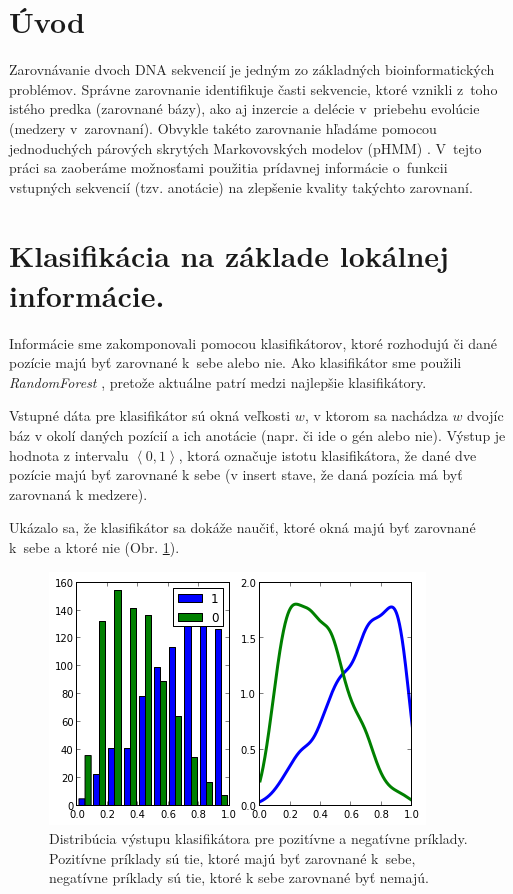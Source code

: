 \documentclass[myposter,portrait]{sciposter}
\def\mysection#1{
{\color{SectionCol}\section*{\sc\bfseries #1}}}
\begin{document}
\begin{multicols*}{3}


\mysection{Úvod}

Zarovnávanie dvoch DNA sekvencií je jedným zo základných
bioinformatických problémov. Správne zarovnanie identifikuje časti
sekvencie, ktoré vznikli z~toho istého predka (zarovnané bázy), ako aj
inzercie a delécie v~priebehu evolúcie (medzery v~zarovnaní). Obvykle
takéto zarovnanie hľadáme pomocou jednoduchých párových skrytých
Markovovských modelov (pHMM) \cite{durbin}. V~tejto práci sa zaoberáme
možnosťami použitia prídavnej informácie o~funkcii vstupných sekvencií
(tzv. anotácie) na zlepšenie kvality takýchto zarovnaní.

\mysection{Klasifikácia na základe lokálnej informácie.}

Informácie sme zakomponovali pomocou klasifikátorov, ktoré rozhodujú či dané pozície majú byť zarovnané k~sebe alebo nie. Ako klasifikátor sme použili \emph{RandomForest} \cite{randomForestPaper}, pretože aktuálne patrí medzi najlepšie klasifikátory.

Vstupné dáta pre klasifikátor sú okná veľkosti $w$, v ktorom sa nachádza $w$ dvojíc báz v okolí daných pozícií a ich anotácie (napr. či ide o gén alebo nie). Výstup je hodnota z intervalu $\left<0,1\right>$, ktorá označuje istotu klasifikátora, že dané dve pozície majú byť zarovnané k sebe (v insert stave, že daná pozícia má byť zarovnaná k medzere).

Ukázalo sa, že klasifikátor sa dokáže naučiť, ktoré okná majú byť zarovnané k~sebe a ktoré nie (Obr. \ref{fig:clf-m-dist}).

\begin{figure}[htp]
    \centering
    \includegraphics[width=\textwidth, clip=true]{images/clf_m_test}
    \caption{Distribúcia výstupu klasifikátora pre pozitívne a negatívne príklady. Pozitívne príklady sú tie, ktoré majú byť zarovnané k~sebe, negatívne príklady sú tie, ktoré k sebe zarovnané byť nemajú.}
    \label{fig:clf-m-dist}
\end{figure}


\end{multicols*}
\end{document}
